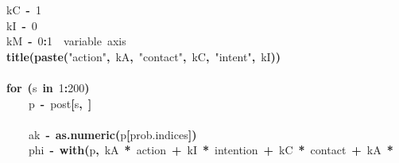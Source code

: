 \documentclass{article}
\makeatletter
\newcommand{\hlnumber}[1]{\textcolor[rgb]{0,0,0}{#1}}%
\newcommand{\hlfunctioncall}[1]{\textcolor[rgb]{.5,0,.33}{\textbf{#1}}}%
\newcommand{\hlstring}[1]{\textcolor[rgb]{.6,.6,1}{#1}}%
\newcommand{\hlkeyword}[1]{\textbf{#1}}%
\newcommand{\hlcomment}[1]{\textcolor[rgb]{.18,.6,.34}{#1}}%
\newcommand{\hlassignement}[1]{\textbf{#1}}%
\newcommand{\hlsymbol}[1]{#1}%
\newcommand{\hlstd}[1]{\textcolor[rgb]{0,0,0}{#1}}%
\newenvironment{kframe}{%
 \def\FrameCommand##1{\hskip\@totalleftmargin \hskip-\fboxsep
 \colorbox{shadecolor}{##1}\hskip-\fboxsep
     \hskip-\linewidth \hskip-\@totalleftmargin \hskip\columnwidth}%
 \MakeFramed {\advance\hsize-\width
   \@totalleftmargin\z@ \linewidth\hsize
   \@setminipage}}%
 {\par\unskip\endMakeFramed}
\newenvironment{knitrout}{}{} %
\makeatother
\begin{document}
\begin{knitrout}
{\begin{kframe}
\begin{flushleft}
\hlstd{}\hlsymbol{kC}{\ }\hlassignement{\usebox{\hlnormalsizeboxlessthan}-}{\ }\hlnumber{1}\hspace*{\fill}\\
\hlstd{}\hlsymbol{kI}{\ }\hlassignement{\usebox{\hlnormalsizeboxlessthan}-}{\ }\hlnumber{0}\hspace*{\fill}\\
\hlstd{}\hlsymbol{kM}{\ }\hlassignement{\usebox{\hlnormalsizeboxlessthan}-}{\ }\hlnumber{0}\hlkeyword{:}\hlnumber{1}{\ }{\ }\hlcomment{\usebox{\hlnormalsizeboxhash}\usebox{\hlnormalsizeboxhash}{\ }variable{\ }axis}\hspace*{\fill}\\
\hlstd{}\hlfunctioncall{title}\hlkeyword{(}\hlfunctioncall{paste}\hlkeyword{(}\hlstring{"{}action"{}}\hlkeyword{,}{\ }\hlsymbol{kA}\hlkeyword{,}{\ }\hlstring{"{}contact"{}}\hlkeyword{,}{\ }\hlsymbol{kC}\hlkeyword{,}{\ }\hlstring{"{}intent"{}}\hlkeyword{,}{\ }\hlsymbol{kI}\hlkeyword{)}\hlkeyword{)}\hspace*{\fill}\\
\hlstd{}\hspace*{\fill}\\
\hlstd{}\hlkeyword{for}{\ }\hlkeyword{(}\hlsymbol{s}{\ }\hlkeyword{in}{\ }\hlnumber{1}\hlkeyword{:}\hlnumber{200}\hlkeyword{)}{\ }\hlkeyword{\usebox{\hlnormalsizeboxopenbrace}}\hspace*{\fill}\\
\hlstd{}{\ }{\ }{\ }{\ }\hlsymbol{p}{\ }\hlassignement{\usebox{\hlnormalsizeboxlessthan}-}{\ }\hlsymbol{post}\hlkeyword{[}\hlsymbol{s}\hlkeyword{,}{\ }\hlkeyword{]}\hspace*{\fill}\\
\hlstd{}\hspace*{\fill}\\
\hlstd{}{\ }{\ }{\ }{\ }\hlsymbol{ak}{\ }\hlassignement{\usebox{\hlnormalsizeboxlessthan}-}{\ }\hlfunctioncall{as.numeric}\hlkeyword{(}\hlsymbol{p}\hlkeyword{[}\hlsymbol{prob.indices}\hlkeyword{]}\hlkeyword{)}\hspace*{\fill}\\
\hlstd{}{\ }{\ }{\ }{\ }\hlsymbol{phi}{\ }\hlassignement{\usebox{\hlnormalsizeboxlessthan}-}{\ }\hlfunctioncall{with}\hlkeyword{(}\hlsymbol{p}\hlkeyword{,}{\ }\hlsymbol{kA}{\ }\hlkeyword{*}{\ }\hlsymbol{action}{\ }\hlkeyword{+}{\ }\hlsymbol{kI}{\ }\hlkeyword{*}{\ }\hlsymbol{intention}{\ }\hlkeyword{+}{\ }\hlsymbol{kC}{\ }\hlkeyword{*}{\ }\hlsymbol{contact}{\ }\hlkeyword{+}{\ }\hlsymbol{kA}{\ }\hlkeyword{*}\hspace*{\fill}\\

\end{flushleft}
\end{kframe}}
\end{knitrout}
\end{document}
